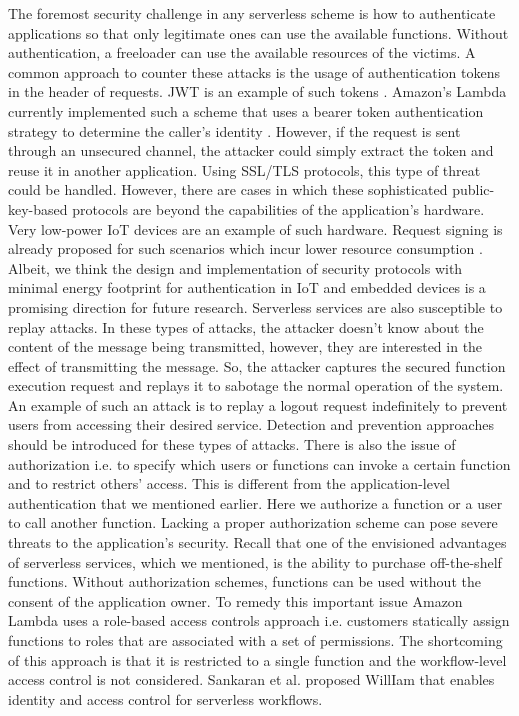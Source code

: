 The foremost security challenge in any serverless scheme is how to authenticate applications so that only legitimate ones can use the available functions. Without authentication, a freeloader can use the available resources of the victims. A common approach to counter these attacks is the usage of authentication tokens in the header of requests. JWT is an example of such tokens . Amazon's Lambda currently implemented such a scheme that uses a bearer token authentication strategy to determine the caller's identity . However, if the request is sent through an unsecured channel, the attacker could simply extract the token and reuse it in another application. Using SSL/TLS protocols, this type of threat could be handled. However, there are cases in which these sophisticated public-key-based protocols are beyond the capabilities of the application's hardware. Very low-power IoT devices are an example of such hardware. Request signing is already proposed for such scenarios which incur lower resource consumption . Albeit, we think the design and implementation of security protocols with minimal energy footprint for authentication in IoT and embedded devices is a promising direction for future research.
Serverless services are also susceptible to replay attacks. In these types of attacks, the attacker doesn't know about the content of the message being transmitted, however, they are interested in the effect of transmitting the message. So, the attacker captures the secured function execution request and replays it to sabotage the normal operation of the system. An example of such an attack is to replay a logout request indefinitely to prevent users from accessing their desired service. Detection and prevention approaches should be introduced for these types of attacks.
There is also the issue of authorization i.e. to specify which users or functions can invoke a certain function and to restrict others' access. This is different from the application-level authentication that we mentioned earlier. Here we authorize a function or a user to call another function. Lacking a proper authorization scheme can pose severe threats to the application's security. Recall that one of the envisioned advantages of serverless services, which we mentioned, is the ability to purchase off-the-shelf functions. Without authorization schemes, functions can be used without the consent of the application owner. To remedy this important issue Amazon Lambda uses a role-based access controls approach i.e. customers statically assign functions to roles that are associated with a set of permissions. The shortcoming of this approach is that it is restricted to a single function and the workflow-level access control is not considered. Sankaran et al.  proposed WillIam that enables identity and access control for serverless workflows.

